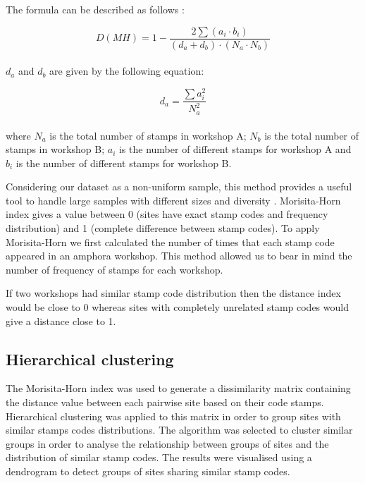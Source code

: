 \documentclass[review]{elsarticle}
\begin{document}
The formula can be described as follows \citep{magurran_measuring_2013}:

\begin{equation}
D(MH) = 1- \frac{2 \sum(a_{i} \cdot b_{i})}{(d_{a} + d_{b}) \cdot (N_{a} \cdot N_{b})}
\end{equation} \\

$d_{a}$ and $d_{b}$ are given by the following equation:

\begin{equation}
d_{a} = \frac{\sum a_{i}^{2}}{N_{a}^{2}} 
\end{equation} \\

where $N_{a}$ is the total number of stamps in workshop A; $N_{b}$ is the total number of stamps in workshop B; $a_{i}$ is the number of different stamps for workshop A and $b_{i}$ is the number of different stamps for workshop B.

Considering our dataset as a non-uniform sample, this method provides a useful tool to handle large samples with different sizes and diversity \citep{wolda_similarity_1981}. Morisita-Horn index gives a value between 0 (sites have exact stamp codes and frequency distribution) and 1 (complete difference between stamp codes). To apply Morisita-Horn we first calculated the number of times that each stamp code appeared in an amphora workshop. 
This method allowed us to bear in mind the number of frequency of stamps for each workshop. 

If two workshops had similar stamp code distribution then the distance index would be close to 0 whereas sites with completely unrelated stamp codes would give a distance close to 1.

\subsection{Hierarchical clustering}

The Morisita-Horn index was used to generate a dissimilarity matrix containing the distance value between each pairwise site based on their code stamps. Hierarchical clustering was applied to this matrix in order to group sites with similar stamps codes distributions. The algorithm was selected to cluster similar groups in order to analyse the relationship between groups of sites and the distribution of similar stamp codes. The results were visualised using a dendrogram to detect groups of sites sharing similar stamp codes.  
\end{document}
